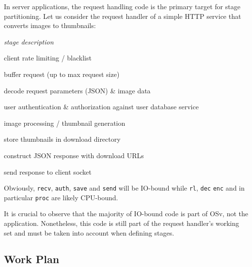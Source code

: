 \documentclass{article}
\begin{document}
In server applications, the request handling code is the primary target for stage partitioning.
Let us consider the request handler of a simple HTTP service that converts images to thumbnails:
{
\newcommand{\stage}[1]{\texttt{#1}}
\begin{description}[parsep=0pt,labelwidth=1cm,itemindent=1cm]
    \item[\textit{\stage{stage}}] \textit{stage description}
    \item[\stage{limit}] client rate limiting / blacklist
    \item[\stage{recv}] buffer request (up to max request size) 
    \item[\stage{dec}] decode request parameters (JSON) \& image data
    \item[\stage{auth}] user authentication \& authorization against user database service
    \item[\stage{proc}] image processing / thumbnail generation
    \item[\stage{save}] store thumbnails in download directory
    \item[\stage{enc}] construct JSON response with download URLs
    \item[\stage{send}] send response to client socket
\end{description}
Obviously, \stage{recv}, \stage{auth}, \stage{save} and \stage{send} will be IO-bound
while \stage{rl}, \stage{dec} \stage{enc} and in particular \stage{proc} are likely CPU-bound.

It is crucial to observe that the majority of IO-bound code is part of OSv, not the application.
Nonetheless, this code is still part of the request handler's working set and must be taken into account when defining stages.
}






\subsection{Work Plan}
\end{document}
